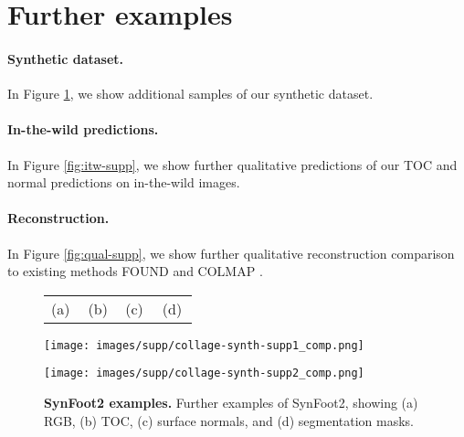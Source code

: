 \clearpage
\setcounter{page}{1}

\maketitlesupplementary


\section{Further examples}

\paragraph{Synthetic dataset.} In Figure \ref{fig:synth-supp}, we show additional samples of our synthetic dataset.



\paragraph{In-the-wild predictions.} In Figure \ref{fig:itw-supp}, we show further qualitative predictions of our TOC and normal predictions on in-the-wild images.



\paragraph{Reconstruction.} In Figure \ref{fig:qual-supp}, we show further qualitative reconstruction comparison to existing methods FOUND \cite{boyne2024found} and COLMAP \cite{schonberger2016structure, schonberger2016pixelwise}.

\begin{figure}[!h]
    \centering
    \begin{minipage}{.8\linewidth}
      \centering

    \begin{tabular}{*{4}{@{}Q{0.2375\linewidth}}@{}}
    (a) & (b) &  (c) & (d)
    \end{tabular}
      
      \texttt{[image: images/supp/collage-synth-supp1\_comp.png]}
    \end{minipage}%

    \vspace{10pt}
    
    \begin{minipage}{.8\linewidth}
      \centering

      
      \texttt{[image: images/supp/collage-synth-supp2\_comp.png]}
    \end{minipage}
    
    \caption{\textbf{SynFoot2 examples.} Further examples of SynFoot2, showing (a) RGB, (b) TOC, (c) surface normals, and (d) segmentation masks.}
    \label{fig:synth-supp}
    
\end{figure}


